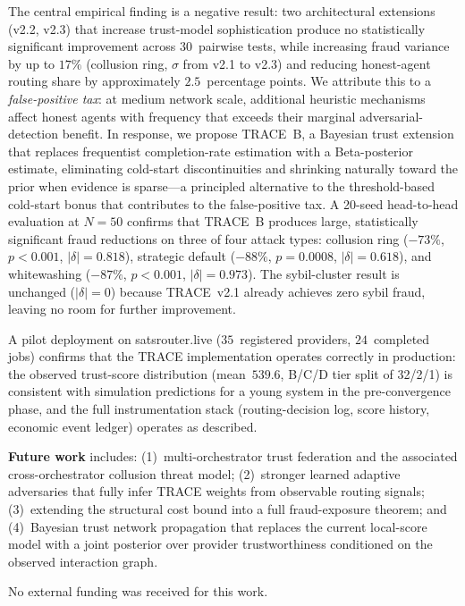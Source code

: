 \documentclass[sigconf,nonacm,10pt]{acmart}
\begin{document}
The central empirical finding is a negative result: two
architectural extensions (v2.2, v2.3) that increase trust-model
sophistication produce no statistically significant improvement
across $30$~pairwise tests, while increasing fraud variance by up
to $17\%$ (collusion ring, $\sigma$ from v2.1 to v2.3) and reducing
honest-agent routing share by approximately $2.5$~percentage points.
We attribute this to a \emph{false-positive tax}: at medium network
scale, additional heuristic mechanisms affect honest agents with
frequency that exceeds their marginal adversarial-detection benefit.
In response, we propose TRACE~B, a Bayesian trust extension that
replaces frequentist completion-rate estimation with a Beta-posterior
estimate, eliminating cold-start discontinuities and shrinking
naturally toward the prior when evidence is sparse---a principled
alternative to the threshold-based cold-start bonus that contributes
to the false-positive tax. A 20-seed head-to-head evaluation at
$N{=}50$ confirms that TRACE~B produces large, statistically
significant fraud reductions on three of four attack types: collusion
ring ($-73\%$, $p<0.001$, $|\delta|=0.818$), strategic default
($-88\%$, $p=0.0008$, $|\delta|=0.618$), and whitewashing
($-87\%$, $p<0.001$, $|\delta|=0.973$). The sybil-cluster result
is unchanged ($|\delta|=0$) because TRACE~v2.1 already achieves
zero sybil fraud, leaving no room for further improvement.

A pilot deployment on satsrouter.live ($35$~registered providers,
$24$~completed jobs) confirms that the TRACE implementation operates
correctly in production: the observed trust-score distribution
(mean~$539.6$, B/C/D tier split of 32/2/1) is consistent with
simulation predictions for a young system in the pre-convergence
phase, and the full instrumentation stack (routing-decision log,
score history, economic event ledger) operates as described.

\noindent\textbf{Future work} includes:
(1)~multi-orchestrator trust federation and the associated
cross-orchestrator collusion threat model;
(2)~stronger learned adaptive adversaries that fully infer TRACE
weights from observable routing signals;
(3)~extending the structural cost bound into a full fraud-exposure
theorem; and
(4)~Bayesian trust network propagation that replaces the current
local-score model with a joint posterior over provider
trustworthiness conditioned on the observed interaction graph.

\begin{acks}
No external funding was received for this work.
\end{acks}
\end{document}
